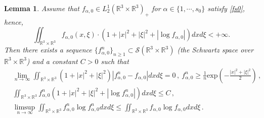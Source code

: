 \documentclass[10pt,a4paper]{amsart}
\newtheorem{lemma}{Lemma}
\def\R{\mathbb{R}}
\def\exp{\mathrm{exp}}
\begin{document}
\begin{lemma}\label{Lemma 4.8}
	Assume that $f_{\alpha,0 } \in L^1_2 ( \R^3 \times \R^3)_+ $ for $\alpha \in \{1,\cdots ,s_0\}$ satisfy \eqref{fs0}, hence,
	\begin{equation*}
		\iint_{\R^3 \times \R^3 } f_{\alpha,0 } (x,\xi ) \cdot (1+|x|^2 +|\xi|^2 + |\log  f_{\alpha,0 } |)  dxd\xi <+ \infty .
	\end{equation*}
	Then there exists a sequence $\{f^n_{\alpha,0 }\}_{n\geq 1} \subset \mathscr{S} (\R^3 \times \R^3 )$ (the Schwartz space over $\R^3 \times \R^3$) and a constant $C > 0$ such that 
\begin{equation}\label{Ap-fs0}
  \begin{aligned}
    & \lim \limits_{n\rightarrow \infty}  \iint_{\R^3 \times \R^3 } (1+|x|^2 +|\xi|^2) |f^n_{\alpha,0 } - f_{\alpha,0 }| dxd\xi=0 \,, \ f^n_{\alpha,0 } \geq \tfrac{1}{n} \exp (- \tfrac{|x|^2+ |\xi|^2 }{2}) \,, \\
    & \iint_{\R^3 \times \R^3} f^n_{\alpha,0 }  (1+|x|^2 +|\xi|^2 + |\log f^n_{\alpha,0 }|)dxd\xi  \leq C \,, \\
    & \limsup \limits_{n\rightarrow \infty} \iint_{\R^3 \times \R^3 } f^n_{\alpha,0 } \log f^n_{\alpha,0 }  dxd\xi  \leq \iint_{\R^3 \times \R^3 } f_{\alpha,0 } \log  f_{\alpha,0 } dxd\xi \,.
  \end{aligned}
\end{equation}
\end{lemma}
\end{document}
